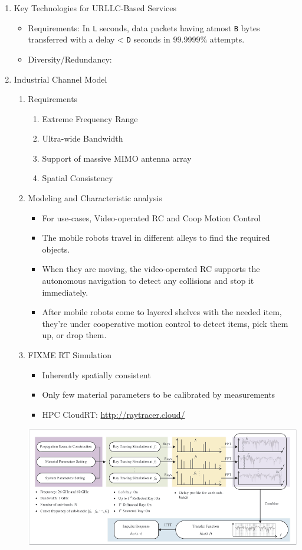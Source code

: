 \documentclass[11pt]{article}
\begin{document}
\begin{enumerate}
\begin{itemize}
\begin{enumerate}
\end{enumerate}
\end{itemize}
\item Key Technologies for URLLC-Based Services
\label{sec:orgf2c3315}
\begin{itemize}
\item Requirements: In \texttt{L} seconds, data packets having atmost \texttt{B} bytes transferred with a delay < \texttt{D} seconds in 99.9999\% attempts.
\item Diversity/Redundancy:
\end{itemize}
\item Industrial Channel Model
\label{sec:org5631000}
\begin{enumerate}
\item Requirements
\label{sec:org5d2e153}
\begin{enumerate}
\item Extreme Frequency Range
\item Ultra-wide Bandwidth
\item Support of massive MIMO antenna array
\item Spatial Consistency
\end{enumerate}
\item Modeling and Characteristic analysis
\label{sec:org89109d3}
\begin{itemize}
\item For use-cases, Video-operated RC and Coop Motion Control
\item The mobile robots travel in different alleys to find the required objects.
\item When they are moving, the video-operated RC supports the autonomous navigation to detect any collisions and stop it immediately.
\item After mobile robots come to layered shelves with the needed item, they're under cooperative motion control to detect items, pick them up, or drop them.
\end{itemize}
\item FIXME RT Simulation
\label{sec:org8e8adce}
\begin{itemize}
\item Inherently spatially consistent
\item Only few material parameters to be calibrated by measurements
\item HPC CloudRT: \url{http://raytracer.cloud/}
\end{itemize}
\begin{center}
\includegraphics[width=.9\linewidth]{./assets/p1f2.png}

\end{center}
\end{enumerate}
\end{enumerate}
\end{document}
